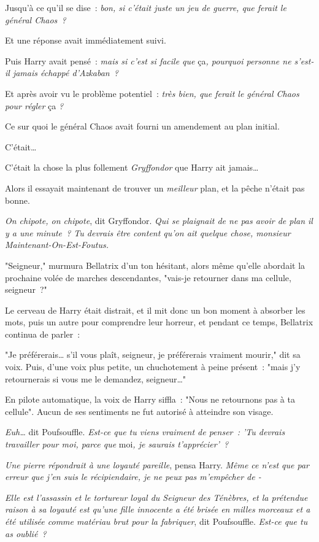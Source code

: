 Jusqu'à ce qu'il se dise~: \emph{bon, si c'était juste un jeu de guerre, que ferait le général Chaos~?}

Et une réponse avait immédiatement suivi.

Puis Harry avait pensé~: \emph{mais si c'est si facile que} ça\emph{, pourquoi personne ne s'est-il jamais échappé d'Azkaban~?}

Et après avoir vu le problème potentiel~: \emph{très bien, que ferait le général Chaos pour régler} ça \emph{?}

Ce sur quoi le général Chaos avait fourni un amendement au plan initial.

C'était…

C'était la chose la plus follement \emph{Gryffondor} que Harry ait jamais…

Alors il essayait maintenant de trouver un \emph{meilleur} plan, et la pêche n'était pas bonne.

\emph{On chipote, on chipote}, dit Gryffondor. \emph{Qui se plaignait de ne pas avoir de plan il y a une minute~? Tu devrais être content qu'on ait quelque chose, monsieur Maintenant-On-Est-Foutus.}

"Seigneur," murmura Bellatrix d'un ton hésitant, alors même qu'elle abordait la prochaine volée de marches descendantes, "vais-je retourner dans ma cellule, seigneur~?"

Le cerveau de Harry était distrait, et il mit donc un bon moment à absorber les mots, puis un autre pour comprendre leur horreur, et pendant ce temps, Bellatrix continua de parler~:

"Je préférerais… s'il vous plaît, seigneur, je préférerais vraiment mourir," dit sa voix. Puis, d'une voix plus petite, un chuchotement à peine présent~: "mais j'y retournerais si vous me le demandez, seigneur…"

En pilote automatique, la voix de Harry siffla~: "Nous ne retournons pas à ta cellule". Aucun de ses sentiments ne fut autorisé à atteindre son visage.

\emph{Euh…} dit Poufsouffle. \emph{Est-ce que tu viens vraiment de penser~: 'Tu devrais travailler pour moi, parce que} moi\emph{, je saurais t'apprécier'~?}

\emph{Une pierre répondrait à une loyauté pareille}, pensa Harry. \emph{Même ce n'est que par erreur que j'en suis le récipiendaire, je ne peux pas m'empêcher de -}

\emph{Elle est l'assassin et le tortureur loyal du Seigneur des Ténèbres, et la prétendue raison à sa loyauté est qu'une fille innocente a été brisée en milles morceaux et a été utilisée comme matériau brut pour la fabriquer}, dit Poufsouffle. \emph{Est-ce que tu as oublié~?}

